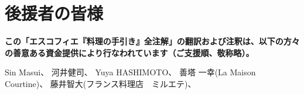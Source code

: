\hypertarget{benefactors}{%
\section{後援者の皆様}\label{benefactors}}

\thispagestyle{empty}

\small

\textbf{この「エスコフィエ『料理の手引き』全注解」の翻訳および注釈は、以下の方々の善意ある資金提供により行なわれています（ご支援順、敬称略）。}

\normalsize

Sin Masui、\href{20180524-23h,2x,novelsoundsmail@gmail.com}{}
河井健司、\href{20180525-0h14,10x,kwibeng@gmail.com}{} Yuya
HASHIMOTO、\href{20180525-1h40,2x,hashimo0910@gmail.com}{} 善塔 一幸(La
Maison
Courtine)、\href{20180525-8h56,10x,kazuyukizento120@docomo.ne.jp}{}
藤井智大(フランス料理店　ミルエテ)、\href{20180525-10h07,1x,apple19761019@yahoo.co.jp}{}
